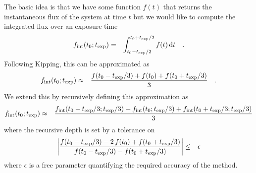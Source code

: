 \documentclass[12pt,preprint]{aastex}
\begin{document}
The basic idea is that we have some function $f(t)$ that returns the
instantaneous flux of the system at time $t$ but we would like to compute the
integrated flux over an exposure time \texp
\begin{eqnarray}
f_\mathrm{int}(t_0;{t_\mathrm{exp}}) &=& \int_{t_0-{t_\mathrm{exp}}/2}^{t_0+{t_\mathrm{exp}}/2} f(t) \,\mathrm{d} t
    \quad.
\end{eqnarray}
Following Kipping, this can be approximated as
\begin{eqnarray}
f_\mathrm{int}(t_0;{t_\mathrm{exp}}) &\approx&
    \frac{f(t_0-{t_\mathrm{exp}}/3)+f(t_0)+f(t_0+{t_\mathrm{exp}}/3)}{3} \quad.
\end{eqnarray}
We extend this by recursively defining this approximation as
\begin{eqnarray}
f_\mathrm{int}(t_0;{t_\mathrm{exp}}) &\approx&
    \frac{f_\mathrm{int}(t_0-{t_\mathrm{exp}}/3;{t_\mathrm{exp}}/3)+f_\mathrm{int}(t_0;{t_\mathrm{exp}}/3)
          +f_\mathrm{int}(t_0+{t_\mathrm{exp}}/3;{t_\mathrm{exp}}/3)}{3}
\end{eqnarray}
where the recursive depth is set by a tolerance on
\begin{eqnarray}
\left | \frac{f(t_0-{t_\mathrm{exp}}/3)-2\,f(t_0)+f(t_0+{t_\mathrm{exp}}/3)}
             {f(t_0-{t_\mathrm{exp}}/3)-f(t_0+{t_\mathrm{exp}}/3)} \right | &\le& \epsilon
\end{eqnarray}
where $\epsilon$ is a free parameter quantifying the required accuracy of the
method.
\end{document}

